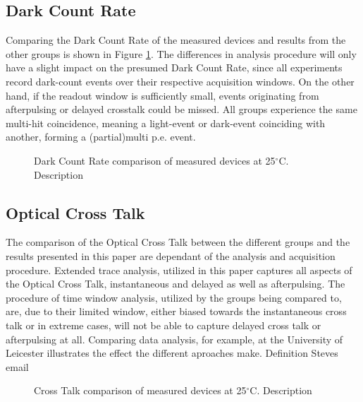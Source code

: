 \documentclass[article,type=msc,colorback,accentcolor=tud9c]{tudthesis}
\begin{document}
\subsection{Dark Count Rate}
\label{subsec:DC_DCR}

Comparing the Dark Count Rate of the measured devices and results from the other groups is shown in Figure \ref{fig:DC_DCR}. The differences in analysis procedure will only have a slight impact on the presumed Dark Count Rate, since all experiments record dark-count events over their respective acquisition windows. On the other hand, if the readout window is sufficiently small, events originating from afterpulsing or delayed crosstalk could be missed. All groups experience the same multi-hit coincidence, meaning a light-event or dark-event coinciding with another, forming a (partial)multi p.e. event. 

\begin{figure}[h]
\begin{centering}
\caption{Dark Count Rate comparison of measured devices at 25$^\circ$C. Description}
\label{fig:DC_DCR}
\end{centering}
\end{figure}

\subsection{Optical Cross Talk}
\label{subsec:DC_OCT}

The comparison of the Optical Cross Talk between the different groups and the results presented in this paper are dependant of the analysis and acquisition procedure. Extended trace analysis, utilized in this paper captures all aspects of the Optical Cross Talk, instantaneous and delayed as well as afterpulsing. The procedure of time window analysis, utilized by the groups being compared to, are, due to their limited window, either biased towards the instantaneous cross talk or in extreme cases, will not be able to capture delayed cross talk or afterpulsing at all. Comparing data analysis, for example, at the University of Leicester illustrates the effect the different aproaches make. Definition Steves email

\begin{figure}[h]
\begin{centering}
\caption{Cross Talk comparison of measured devices at 25$^\circ$C. Description}
\label{fig:DC_OCT}
\end{centering}
\end{figure}
\end{document}
